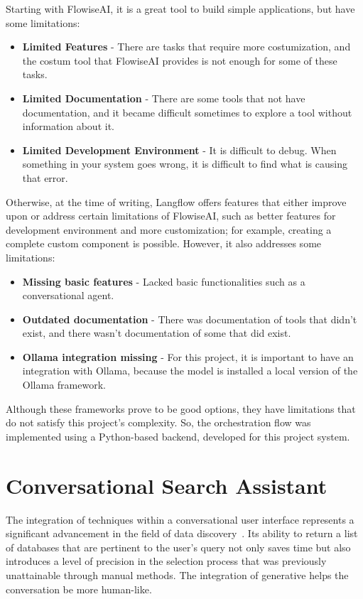 Starting with FlowiseAI, it is a great tool to build simple {\llm} applications, but have some limitations:

\begin{itemize}
	\item \textbf{Limited Features} - There are tasks that require more costumization, and the costum tool that FlowiseAI provides is not enough for some of these tasks.
	\item \textbf{Limited Documentation} - There are some tools that not have documentation, and it became difficult sometimes to explore a tool without information about it.
	\item \textbf{Limited Development Environment} - It is difficult to debug. When something in your system goes wrong, it is difficult to find what is causing that error. 
\end{itemize}

Otherwise, at the time of writing, Langflow offers features that either improve upon or address certain limitations of FlowiseAI, such as better features for development environment and more customization; for example, creating a complete custom component is possible. However, it also addresses some limitations:

\begin{itemize}
	\item \textbf{Missing basic features} - Lacked basic functionalities such as a conversational agent.
	\item \textbf{Outdated documentation} - There was documentation of tools that didn't exist, and there wasn't documentation of some that did exist. 
	\item \textbf{Ollama integration missing} - For this project, it is important to have an integration with Ollama, because the {\llm} model is installed a local version of the Ollama framework.
\end{itemize}


Although these frameworks prove to be good options, they have limitations that do not satisfy this project's complexity. So, the {\llm} orchestration flow was implemented using a Python-based backend, developed for this project system.


\section{Conversational Search Assistant}

The integration of {\ir} techniques within a conversational user interface represents a significant advancement in the field of data discovery~\cite{ritzel2019development}. Its ability to return a list of databases that are pertinent to the user's query not only saves time but also introduces a level of precision in the selection process that was previously unattainable through manual methods. The integration of generative {\ai} helps the conversation be more human-like. %

